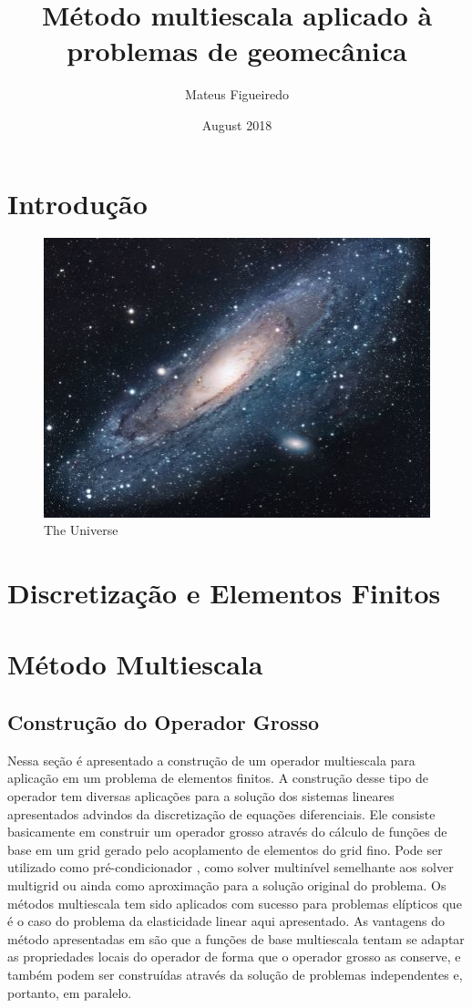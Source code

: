 \documentclass{article}
\title{Método multiescala aplicado à problemas de geomecânica}
\author{Mateus Figueiredo}
\date{August 2018}
\begin{document}
\maketitle

\section{Introdução}


\begin{figure}[h!]
\centering
\includegraphics[scale=1.7]{universe}
\caption{The Universe}
\label{fig:universe}
\end{figure}

\section{Discretização e Elementos Finitos \label{ch:discretizacao}}


\section{Método Multiescala}

\subsection{Construção do Operador Grosso}

Nessa seção é apresentado a construção de um operador multiescala para aplicação em um problema de elementos finitos. A construção desse tipo de operador tem diversas aplicações para a solução dos sistemas lineares apresentados advindos da discretização de equações diferenciais. Ele consiste basicamente em construir um operador grosso através do cálculo de funções de base em um grid gerado pelo acoplamento de elementos do grid fino. Pode ser utilizado como pré-condicionador \cite{casteletto}, como solver multinível semelhante aos solver multigrid ou ainda como aproximação para a solução original do problema. Os métodos multiescala tem sido aplicados com sucesso para problemas elípticos que é o caso do problema da elasticidade linear aqui apresentado. As vantagens do método apresentadas em \cite{thomashou} são que a funções de base multiescala tentam se adaptar as propriedades locais do operador de forma que o operador grosso as conserve, e também podem ser construídas através da solução de problemas independentes e, portanto, em paralelo.
\end{document}
